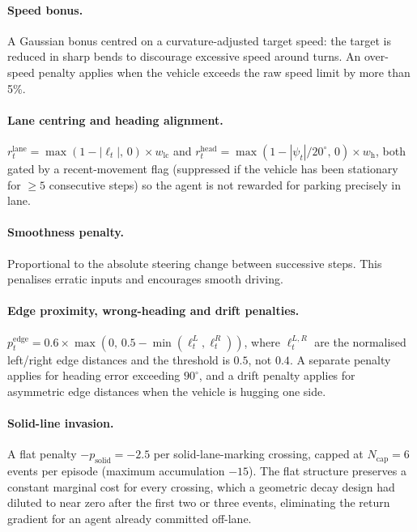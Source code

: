 \paragraph{Speed bonus.}
A Gaussian bonus centred on a curvature-adjusted target speed: the target is reduced in sharp
bends to discourage excessive speed around turns. An over-speed penalty applies when the vehicle
exceeds the raw speed limit by more than 5\%.

\paragraph{Lane centring and heading alignment.}
\(r^{\mathrm{lane}}_t = \max(1 - |\ell_t|,\,0) \times w_{\mathrm{lc}}\) and
\(r^{\mathrm{head}}_t = \max(1 - |\psi_t|/20^\circ,\,0) \times w_{\mathrm{h}}\),
both gated by a recent-movement flag (suppressed if the vehicle has been stationary for
\(\ge 5\) consecutive steps) so the agent is not rewarded for parking precisely in lane.

\paragraph{Smoothness penalty.}
Proportional to the absolute steering change between successive steps. This penalises erratic
inputs and encourages smooth driving.

\paragraph{Edge proximity, wrong-heading and drift penalties.}
\(p^{\mathrm{edge}}_t = 0.6 \times \max(0,\, 0.5 - \min(\ell^L_t, \ell^R_t))\), where
\(\ell^{L,R}_t\) are the normalised left/right edge distances and the threshold is \(0.5\), not
\(0.4\). A separate penalty applies for heading error exceeding \(90^\circ\), and a drift penalty applies for asymmetric
edge distances when the vehicle is hugging one side.

\paragraph{Solid-line invasion.}
A flat penalty \(-p_{\mathrm{solid}} = -2.5\) per solid-lane-marking crossing, capped at
\(N_{\mathrm{cap}} = 6\) events per episode (maximum accumulation \(-15\)).  The flat structure
preserves a constant marginal cost for every crossing, which a geometric decay design had
diluted to near zero after the first two or three events, eliminating the return gradient for an
agent already committed off-lane.

